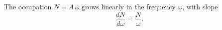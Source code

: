 \documentclass{article}
\begin{document}
The occupation $N = A\,\omega$ grows linearly in the frequency $\omega$, with slope
\begin{equation}
\frac{dN}{d\omega} = \frac{N}{\omega} .
\label{eq:d}
\end{equation}
\end{document}

